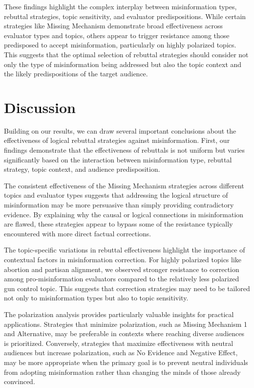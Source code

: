 \documentclass[twocolumn]{article}
\begin{document}
These findings highlight the complex interplay between misinformation types, rebuttal strategies, topic sensitivity, and evaluator predispositions. While certain strategies like Missing Mechanism demonstrate broad effectiveness across evaluator types and topics, others appear to trigger resistance among those predisposed to accept misinformation, particularly on highly polarized topics. This suggests that the optimal selection of rebuttal strategies should consider not only the type of misinformation being addressed but also the topic context and the likely predispositions of the target audience.

\section{Discussion}
Building on our results, we can draw several important conclusions about the effectiveness of logical rebuttal strategies against misinformation. First, our findings demonstrate that the effectiveness of rebuttals is not uniform but varies significantly based on the interaction between misinformation type, rebuttal strategy, topic context, and audience predisposition.

The consistent effectiveness of the Missing Mechanism strategies across different topics and evaluator types suggests that addressing the logical structure of misinformation may be more persuasive than simply providing contradictory evidence. By explaining why the causal or logical connections in misinformation are flawed, these strategies appear to bypass some of the resistance typically encountered with more direct factual corrections.

The topic-specific variations in rebuttal effectiveness highlight the importance of contextual factors in misinformation correction. For highly polarized topics like abortion and partisan alignment, we observed stronger resistance to correction among pro-misinformation evaluators compared to the relatively less polarized gun control topic. This suggests that correction strategies may need to be tailored not only to misinformation types but also to topic sensitivity.

The polarization analysis provides particularly valuable insights for practical applications. Strategies that minimize polarization, such as Missing Mechanism 1 and Alternative, may be preferable in contexts where reaching diverse audiences is prioritized. Conversely, strategies that maximize effectiveness with neutral audiences but increase polarization, such as No Evidence and Negative Effect, may be more appropriate when the primary goal is to prevent neutral individuals from adopting misinformation rather than changing the minds of those already convinced.
\end{document}
